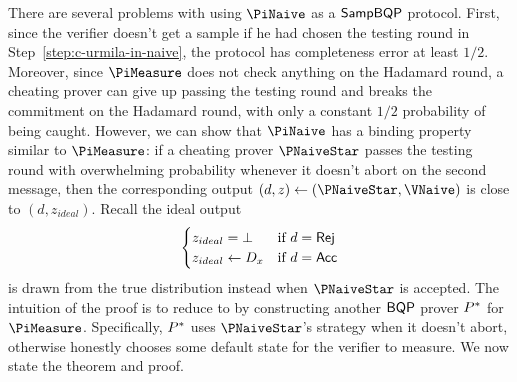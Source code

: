 There are several problems with using $\PiNaive$ as a $\operatorname{\mathsf{SampBQP}}$ protocol. First, since the verifier doesn't get a sample if he had chosen the testing round in Step~\ref{step:c-urmila-in-naive}, the protocol has completeness error at least $1/2$. Moreover, since $\PiMeasure$ does not check anything on the Hadamard round, a cheating prover can give up passing the testing round and breaks the commitment on the Hadamard round, with only a constant $1/2$ probability of being caught.
However, we can show that $\PiNaive$ has a binding property similar to $\PiMeasure$:
if a cheating prover $\PNaiveStar$ passes the testing round with overwhelming probability whenever it doesn't abort on the second message,
then the corresponding output $(d, z)\leftarrow(\PNaiveStar, \VNaive)$ is close to $(d, z_{ideal})$.
Recall the ideal output
$$\begin{cases}
	z_{ideal}=\bot & \text{if } d=\mathsf{Rej}\\
	z_{ideal}\leftarrow D_x & \text{if } d=\mathsf{Acc}
\end{cases}$$
is drawn from the true distribution instead when $\PNaiveStar$ is accepted.
The intuition of the proof is to reduce to  by constructing another $\operatorname{\mathsf{BQP}}$ prover $P^*$ for $\PiMeasure$.
Specifically, $P^*$ uses $\PNaiveStar$'s strategy when it doesn't abort, otherwise honestly chooses some default state for the verifier to measure.
We now state the theorem and proof.

